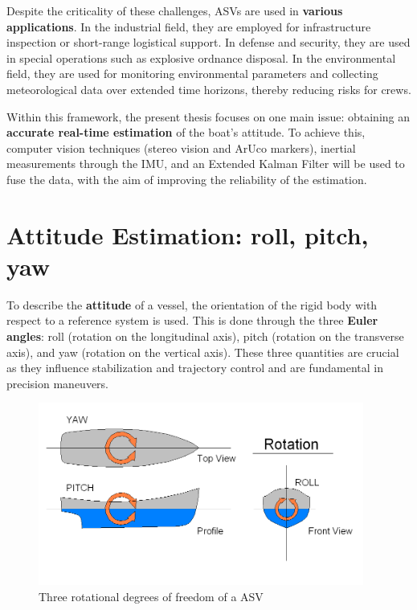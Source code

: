 Despite the criticality of these challenges, ASVs are used in \textbf{various applications}. In the industrial field, they are employed for infrastructure inspection or short-range logistical support. In defense and security, they are used in special operations such as explosive ordnance disposal. In the environmental field, they are used for monitoring environmental parameters and collecting meteorological data over extended time horizons, thereby reducing risks for crews.

Within this framework, the present thesis focuses on one main issue: obtaining an \textbf{accurate real-time estimation} of the boat’s attitude. To achieve this, computer vision techniques (stereo vision and ArUco markers), inertial measurements through the IMU, and an Extended Kalman Filter will be used to fuse the data, with the aim of improving the reliability of the estimation.

\section{Attitude Estimation: roll, pitch, yaw}

To describe the \textbf{attitude} of a vessel, the orientation of the rigid body with respect to a reference system is used. This is done through the three \textbf{Euler angles}\cite{Euler_angles}: roll (rotation on the longitudinal axis), pitch (rotation on the transverse axis), and yaw (rotation on the vertical axis). These three quantities are crucial as they influence stabilization and trajectory control and are fundamental in precision maneuvers.  

\begin{figure}[ht]
  \centering
  \includegraphics[height=6cm]{images/euler_angles.png}
  \caption{Three rotational degrees of freedom of a ASV}\label{unipd-logo}
\end{figure}


